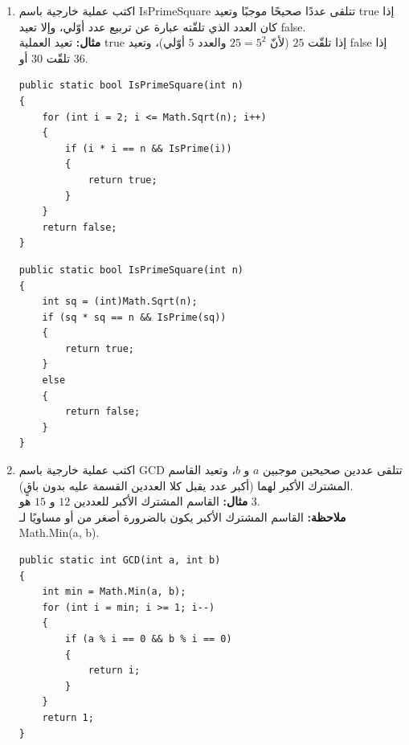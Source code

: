 \documentclass[14pt]{extarticle}
\begin{document}
\begin{enumerate}[resume, itemsep=2em]
\item اكتب عملية خارجية باسم \textenglish{IsPrimeSquare} تتلقى عددًا صحيحًا موجبًا وتعيد \textenglish{true} إذا كان العدد الذي تلقّته عبارة عن تربيع عدد أوّلي، وإلا تعيد \textenglish{false}. \\
\textbf{مثال:} تعيد العملية \textenglish{true} إذا تلقّت $25$ (لأنّ $25 = 5^2$ والعدد $5$ أوّلي)، وتعيد \textenglish{false} إذا تلقّت $30$ أو $36$.
\ifwithsols
\begin{boxSolution}[1]
\begin{english}
\begin{verbatim}
public static bool IsPrimeSquare(int n)
{
    for (int i = 2; i <= Math.Sqrt(n); i++)
    {
        if (i * i == n && IsPrime(i))
        {
            return true;
        }
    }
    return false;
}
\end{verbatim}
\end{english}
\end{boxSolution}

\filbreak

\begin{boxSolution}[2]
\begin{english}
\begin{verbatim}
public static bool IsPrimeSquare(int n)
{
    int sq = (int)Math.Sqrt(n);
    if (sq * sq == n && IsPrime(sq))
    {
        return true;
    }
    else
    {
        return false;
    }
}
\end{verbatim}
\end{english}
\end{boxSolution}
\fi
\filbreak

\item اكتب عملية خارجية باسم \textenglish{GCD} تتلقى عددين صحيحين موجبين $a$ و $b$، وتعيد القاسم المشترك الأكبر لهما (أكبر عدد يقبل كلا العددين القسمة عليه بدون باقٍ). \\
\textbf{مثال:} القاسم المشترك الأكبر للعددين $12$ و $15$ هو $3$. \\
\textbf{ملاحظة:} القاسم المشترك الأكبر يكون بالضرورة أصغر من أو مساويًا لـ \textenglish{Math.Min(a, b)}.
\ifwithsols
\begin{boxSolution}
\begin{english}
\begin{verbatim}
public static int GCD(int a, int b)
{
    int min = Math.Min(a, b);
    for (int i = min; i >= 1; i--)
    {
        if (a % i == 0 && b % i == 0)
        {
            return i;
        }
    }
    return 1;
}
\end{verbatim}
\end{english}
\end{boxSolution}
\fi
\filbreak


\end{enumerate}
\end{document}
